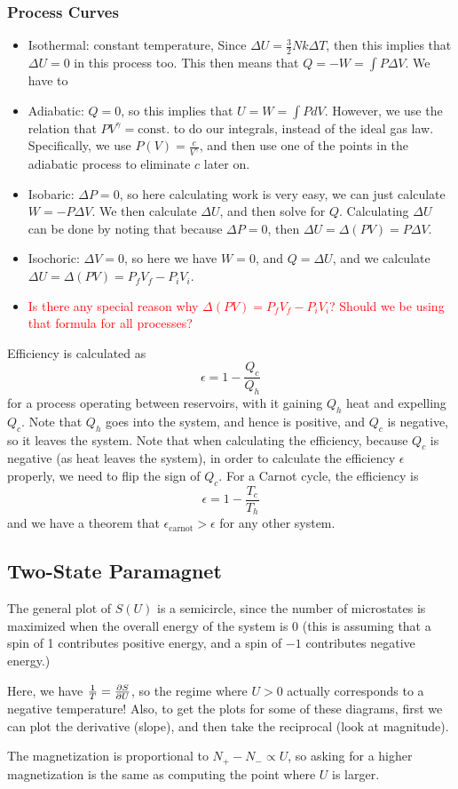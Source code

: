 \documentclass[10pt]{article}
\newcommand{\question}[1]{\textcolor{red}{#1}}
\begin{document}
	\subsubsection{Process Curves}
	\begin{itemize}
		\item Isothermal: constant temperature, Since  \( \Delta U = \frac{3}{2}Nk\Delta T \), then this implies that 
			\( \Delta U = 0 \) in this process too. This then means that \( Q = -W = \int P \Delta V \).  We have to 
		\item Adiabatic: \( Q = 0 \), so this implies that \( U = W = \int P dV \). However, we use the relation that 
			\( PV^{\gamma} = \text{const.} \) to do our integrals, instead of the ideal gas law. Specifically, we 
			use \( P(V) = \frac{c}{V^{\gamma}} \), and then use one of the points in the adiabatic process to eliminate \( c \) later
			on.
		\item Isobaric: \( \Delta P = 0 \), so here calculating work is very easy, we can just calculate \( W = -P \Delta V \). We 
			then calculate \( \Delta U \), and then solve for \( Q \). Calculating \( \Delta U \) can be done by noting that 
			because \( \Delta P = 0 \), then \( \Delta U = \Delta(PV) = P \Delta V \). 
		\item Isochoric: \( \Delta V = 0 \), so here we have \( W = 0 \), and \( Q = \Delta U \), and we calculate \( \Delta U = 
			\Delta (PV) = P_f V_f - P_i V_i\). 
		\item \question{Is there any special reason why \( \Delta (PV) = P_fV_f - P_iV_i \)? Should we be using that 
			formula for all processes?}
	\end{itemize}
	Efficiency is calculated as 
	\[
	\epsilon = 1 - \frac{Q_c}{Q_h}
	\] 
	for a process operating between reservoirs, with it gaining \( Q_h \) heat and expelling \( Q_c \). Note that \( Q_h \) goes 
	into the system, and hence is positive, and \( Q_c \) is negative, so it leaves the system. Note that when calculating 
	the efficiency, because \( Q_c \) is negative (as heat leaves the system), in order to calculate the efficiency 
	\( \epsilon \) properly, we need to flip the sign of \( Q_c \). For a Carnot cycle, the efficiency is 
	\[
	\epsilon = 1 - \frac{T_c}{T_h}
	\] 
	and we have a theorem that \( \epsilon_{\text{carnot}} > \epsilon \) for any other system.  

	\subsection{Two-State Paramagnet} 
	The general plot of \( S(U) \) is a semicircle, since the number of microstates is maximized when the overall energy 
	of the system is 0 (this is assuming that a spin of 1 contributes positive energy, and a spin of \( -1 \) contributes 
	negative energy.)

	Here, we have \( \frac{1}{T} = \pdv{S}{U} \), so the regime where \( U > 0 \) actually corresponds to a negative temperature! 
	Also, to get the plots for some of these diagrams, first we can plot the derivative (slope), and then take the reciprocal 
	(look at magnitude). 

	The magnetization is proportional to \( N_+ - N_- \propto U \), so asking for a higher magnetization is the same 
	as computing the point where \( U \) is larger.  
\end{document}
